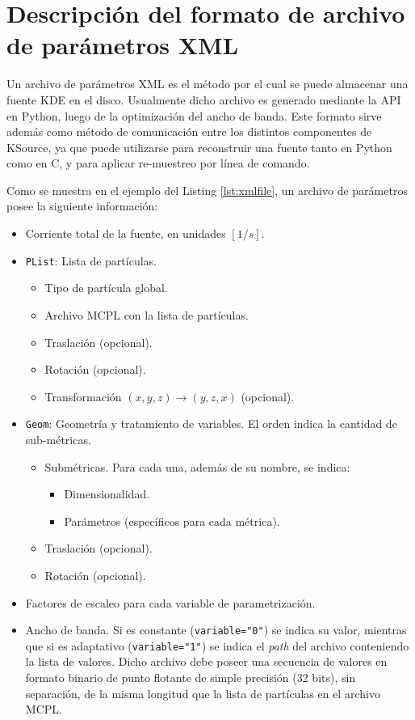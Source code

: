 \section{Descripción del formato de archivo de parámetros XML}

Un archivo de parámetros XML es el método por el cual se puede almacenar una fuente KDE en el disco. Usualmente dicho archivo es generado mediante la API en Python, luego de la optimización del ancho de banda. Este formato sirve además como método de comunicación entre los distintos componentes de KSource, ya que puede utilizarse para reconstruir una fuente tanto en Python como en C, y para aplicar re-muestreo por línea de comando.

Como se muestra en el ejemplo del Listing \ref{lst:xmlfile}, un archivo de parámetros posee la siguiente información:
\begin{itemize}
	\item Corriente total de la fuente, en unidades $[1/s]$.
	\item \verb|PList|: Lista de partículas.
	\begin{itemize}
		\item Tipo de partícula global.
		\item Archivo MCPL con la lista de partículas.
		\item Traslación (opcional).
		\item Rotación (opcional).
		\item Transformación $(x,y,z)\rightarrow (y,z,x)$ (opcional).
	\end{itemize}
	\item \verb|Geom|: Geometría y tratamiento de variables. El orden indica la cantidad de sub-métricas.
	\begin{itemize}
		\item Submétricas. Para cada una, además de su nombre, se indica:
		\begin{itemize}
			\item Dimensionalidad.
			\item Parámetros (específicos para cada métrica).
		\end{itemize}
		\item Traslación (opcional).
		\item Rotación (opcional).
	\end{itemize}
	\item Factores de escaleo para cada variable de parametrización.
	\item Ancho de banda. Si es constante (\verb|variable="0"|) se indica su valor, mientras que si es adaptativo (\verb|variable="1"|) se indica el \emph{path} del archivo conteniendo la lista de valores. Dicho archivo debe poseer una secuencia de valores en formato binario de punto flotante de simple precisión (32 bits), sin separación, de la misma longitud que la lista de partículas en el archivo MCPL.
\end{itemize}

